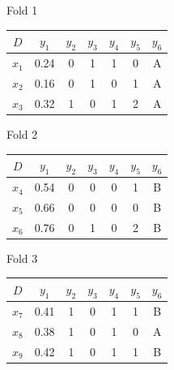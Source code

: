 \documentclass[12pt]{article}
\begin{document}
\begin{enumerate}[leftmargin=\labelsep]
\begin{enumerate}
\begin{table}[H]
            \begin{minipage}{.4\linewidth}
                \centering
                {\bfseries\strut Fold 1}
                \begin{tabular}{c|cccccc}
                    \(D\) & \(y_1\) & \(y_2\) & \(y_3\) & \(y_4\) & \(y_5\) & \(y_6\)\\
                    \hline
                    \(x_1\) & 0.24 & 0 & 1 & 1 & 0 & A  \\
                    \(x_2\) & 0.16 & 0 & 1 & 0 & 1 & A  \\
                    \(x_3\) & 0.32 & 1 & 0 & 1 & 2 & A  \\
                \end{tabular}
            \end{minipage}
            \quad
            \begin{minipage}{.4\linewidth}
                \centering
                {\bfseries\strut Fold 2}
                \begin{tabular}{c|cccccc}
                    \(D\) & \(y_1\) & \(y_2\) & \(y_3\) & \(y_4\) & \(y_5\) & \(y_6\)\\
                    \hline
                    \(x_4\) & 0.54 & 0 & 0 & 0 & 1 & B  \\
                    \(x_5\) & 0.66 & 0 & 0 & 0 & 0 & B  \\
                    \(x_6\) & 0.76 & 0 & 1 & 0 & 2 & B  \\
                \end{tabular}
            \end{minipage}

            \vskip 0.3cm
            \begin{minipage}{.4\linewidth}
                \centering
                {\bfseries\strut Fold 3}
                \begin{tabular}{c|cccccc}
                    \(D\) & \(y_1\) & \(y_2\) & \(y_3\) & \(y_4\) & \(y_5\) & \(y_6\)\\
                    \hline
                    \(x_7\) & 0.41 & 1 & 0 & 1 & 1 & B  \\
                    \(x_8\) & 0.38 & 1 & 0 & 1 & 0 & A  \\
                    \(x_9\) & 0.42 & 1 & 0 & 1 & 1 & B  \\
                \end{tabular}
            \end{minipage}
          \end{table}


\end{enumerate}
\end{enumerate}
\end{document}
